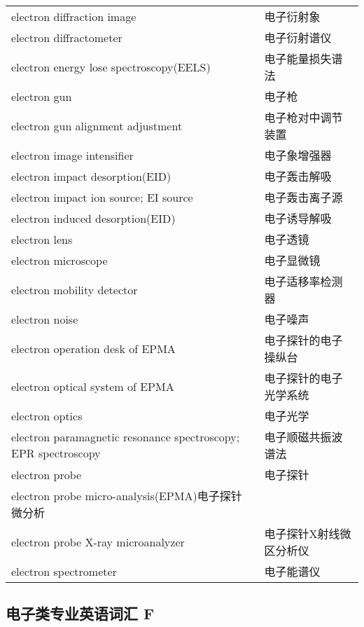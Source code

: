 \documentclass[
]{article}
\begin{document}
\begin{longtable}[]{@{}ll@{}}
electron diffraction image & 电子衍射象 \\
electron diffractometer & 电子衍射谱仪 \\
electron energy lose spectroscopy(EELS) & 电子能量损失谱法 \\
electron gun & 电子枪 \\
electron gun alignment adjustment & 电子枪对中调节装置 \\
electron image intensifier & 电子象增强器 \\
electron impact desorption(EID) & 电子轰击解吸 \\
electron impact ion source; EI source & 电子轰击离子源 \\
electron induced desorption(EID) & 电子诱导解吸 \\
electron lens & 电子透镜 \\
electron microscope & 电子显微镜 \\
electron mobility detector & 电子适移率检测器 \\
electron noise & 电子噪声 \\
electron operation desk of EPMA & 电子探针的电子操纵台 \\
electron optical system of EPMA & 电子探针的电子光学系统 \\
electron optics & 电子光学 \\
electron paramagnetic resonance spectroscopy; EPR spectroscopy &
电子顺磁共振波谱法 \\
electron probe & 电子探针 \\
electron probe micro-analysis(EPMA)电子探针微分析 & \\
electron probe X-ray microanalyzer & 电子探针X射线微区分析仪 \\
electron spectrometer & 电子能谱仪 \\
\bottomrule()
\end{longtable}

\hypertarget{ux7535ux5b50ux7c7bux4e13ux4e1aux82f1ux8bedux8bcdux6c47-f}{%
\subsection{\texorpdfstring{电子类专业英语词汇 F
}{电子类专业英语词汇 F }}\label{ux7535ux5b50ux7c7bux4e13ux4e1aux82f1ux8bedux8bcdux6c47-f}}
\end{document}
